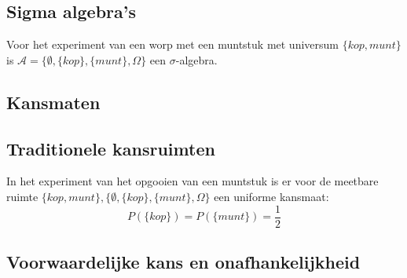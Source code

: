 \documentclass[main.tex]{subfiles}
\begin{document}
\subsection*{Sigma algebra's}

\begin{vb}
  Voor het experiment van een worp met een muntstuk met universum $\{kop,munt\}$ is $\mathcal{A} = \{ \emptyset, \{kop\}, \{munt\}, \Omega \}$ een $\sigma$-algebra.
\end{vb}

\subsection*{Kansmaten}

\subsection*{Traditionele kansruimten}
\begin{vb}
  In het experiment van het opgooien van een muntstuk is er voor de meetbare ruimte $\{kop,munt\}, \{ \emptyset, \{kop\}, \{munt\}, \Omega \}$ een uniforme kansmaat:
  \[ P(\{kop\}) = P(\{munt\}) = \frac{1}{2} \]
\end{vb}


\subsection*{Voorwaardelijke kans en onafhankelijkheid}
\label{sec:voorw-kans-en}
\end{document}
